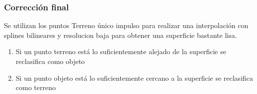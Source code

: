 \begin{frame}
  \frametitle{Corrección final}
Se utilizan los puntos \alert<1>{Terreno único impulso} para realizar una
interpolación con splines bilineares y resolucion baja para obtener una
superficie bastante lisa.
  \begin{minipage}{0.5\textwidth}
    \begin{enumerate}
      \item<2-> Si un punto terreno está lo suficientemente alejado de la superficie se reclasifica como \alert<2>{objeto}
      \item<3-> Si un punto objeto está lo suficientemente cercano a la superficie se reclasifica como \alert<3>{terreno}
    \end{enumerate}
  \end{minipage}%
  ~%
  \begin{minipage}{0.45\textwidth}
   \begin{figure}[h!]
   \centering
   \end{figure}
  \end{minipage}
\end{frame}
